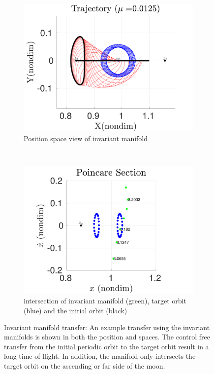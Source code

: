 \begin{figure} 
        \centering 
        \begin{subfigure}[htbp]{0.5\textwidth} 
            \includegraphics[width=\textwidth]{figures/2017_JAS/manifold_trajectory} 
                \caption{Position space view of invariant manifold} \label{fig:manifold_trajectory} 
        \end{subfigure}~ %
        \begin{subfigure}[htbp]{0.5\textwidth} 
            \includegraphics[width=\textwidth]{figures/2017_JAS/manifold_poincare} 
                \caption{\Poincare intersection of invariant manifold (green), target orbit (blue) and the initial orbit (black)} \label{fig:manifold_poincare} 
        \end{subfigure} 
        \caption{Invariant manifold transfer: An example transfer using the invariant manifolds is shown in both the position and \Poincare spaces.
        The control free transfer from the initial periodic orbit to the target orbit result in a long time of flight. 
    In addition, the manifold only intersects the target orbit on the ascending or far side of the moon.}
        \label{fig:invariant_manifold_transfer} 
\end{figure}

